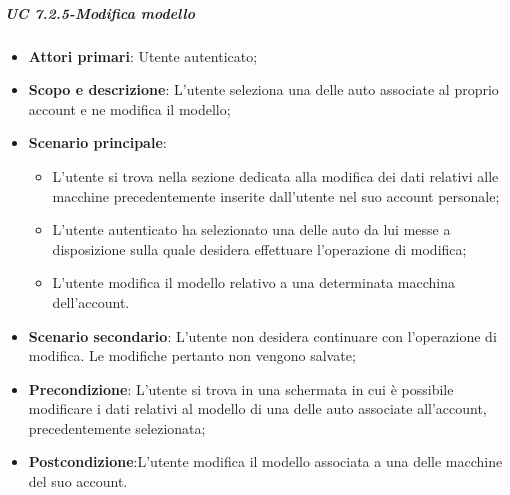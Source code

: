     \subparagraph{UC 7.2.5-Modifica modello}
            \begin{itemize}
                \item \textbf{Attori primari}: Utente autenticato;
               
                \item \textbf{Scopo e descrizione}: L'utente seleziona una delle auto associate al proprio account e ne modifica il modello; 
                \item \textbf{Scenario principale}:
                    \begin{itemize}
                        \item L'utente si trova nella sezione dedicata alla modifica dei dati relativi alle macchine precedentemente inserite dall'utente nel suo account personale;
                        \item L'utente autenticato ha selezionato una delle auto da lui messe a disposizione sulla quale desidera effettuare l'operazione di modifica;
                        \item L'utente modifica il modello relativo a una determinata macchina dell'account.
                    \end{itemize}
                \item \textbf{Scenario secondario}: L'utente non desidera continuare con l'operazione di modifica. Le modifiche pertanto non vengono salvate;
        
                \item \textbf{Precondizione}: L'utente si trova in una schermata in cui è possibile modificare i dati relativi al modello di una delle auto associate all'account, precedentemente selezionata;
                \item \textbf{Postcondizione}:L'utente modifica il modello associata a una delle macchine del suo account.
            \end{itemize}
            
